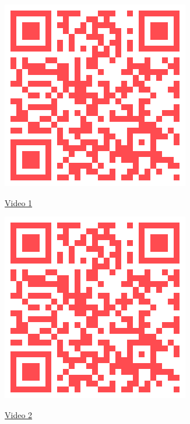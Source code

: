 \begin{figure}[!h]
     \centering
     \begin{subfigure}[b]{0.2\linewidth}
         \centering
         \href{https://youtu.be/TC6r1r14FA0}{\includegraphics[width=\textwidth]{qrcodes/icra2021.png}}\par \href{https://youtu.be/TC6r1r14FA0}{Video 1}
     \end{subfigure}
     \hfill
     \begin{subfigure}[b]{0.2\linewidth}
         \centering
         \href{https://youtu.be/fscv1XtzB_o}{\includegraphics[width=\textwidth]{qrcodes/icra2021.png}}\par \href{https://youtu.be/fscv1XtzB_o}{Video 2}

\end{subfigure}
\end{figure}
